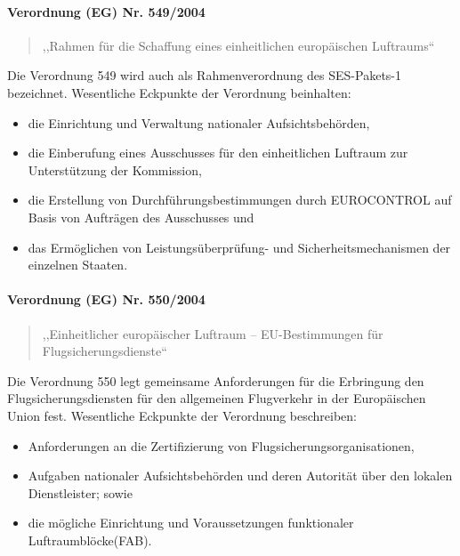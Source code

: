 
\paragraph{Verordnung (EG) Nr. 549/2004} \label{er_549}
    \begin{quote}
        \hspace{-2mm},,Rahmen für die Schaffung eines einheitlichen europäischen Luftraums``\cite{2004R0549, 2004R0549_summary}
    \end{quote}
Die Verordnung 549 wird auch als Rahmenverordnung des SES-Pakets-1 bezeichnet.
Wesentliche Eckpunkte der Verordnung beinhalten:
    \begin{itemize}
        \item die Einrichtung und Verwaltung nationaler Aufsichtsbehörden,
        \item die Einberufung eines Ausschusses für den einheitlichen Luftraum zur Unterstützung der Kommission,
        \item die Erstellung von Durchführungsbestimmungen durch EUROCONTROL auf Basis von Aufträgen des Ausschusses und
        \item    das Ermöglichen von Leistungsüberprüfung- und Sicherheitsmechanismen der einzelnen Staaten. \cite{2004R0549_summary}
    \end{itemize}

\pagebreak
        
\paragraph{Verordnung (EG) Nr. 550/2004} \label{er_550}
\begin{quote}
    ,,Einheitlicher europäischer Luftraum – EU-Bestimmungen für Flugsicherungsdienste``\cite{2004R0550, 2004R0550_summary}
\end{quote}
    Die Verordnung 550 legt gemeinsame Anforderungen für die Erbringung den Flugsicherungsdiensten für den allgemeinen Flugverkehr in der Europäischen Union fest. 
Wesentliche Eckpunkte der Verordnung beschreiben:
    \begin{itemize}
        \item Anforderungen an die Zertifizierung von Flugsicherungsorganisationen,
        \item Aufgaben nationaler Aufsichtsbehörden und deren Autorität über den lokalen Dienstleister; sowie
        \item die mögliche Einrichtung und Voraussetzungen funktionaler Luftraumblöcke(FAB). \cite{2004R0550_summary}
    \end{itemize}

